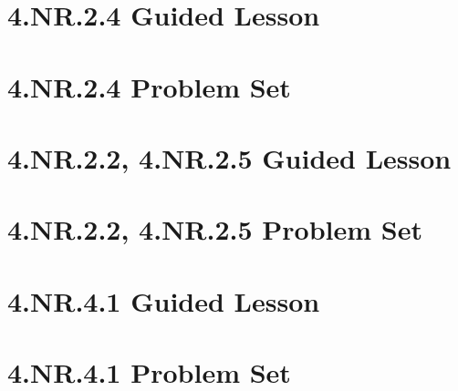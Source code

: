 \documentclass[a4paper,12pt]{article}
\begin{document}
\section{4.NR.2.4 Guided Lesson}


\newpage
\section{4.NR.2.4 Problem Set}


\newpage
\section{4.NR.2.2, 4.NR.2.5 Guided Lesson}


\newpage
\section{4.NR.2.2, 4.NR.2.5 Problem Set}


\newpage
\section{4.NR.4.1 Guided Lesson}


\newpage
\section{4.NR.4.1 Problem Set}

\end{document}
